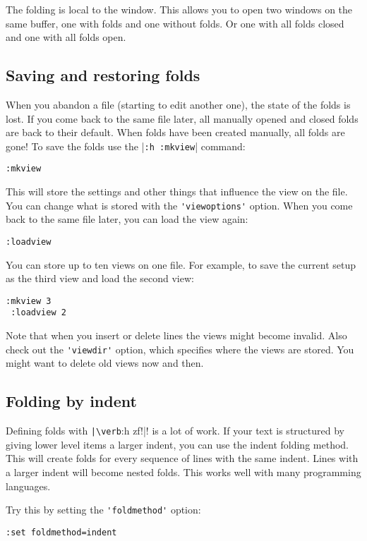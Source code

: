 The folding is local to the window.
This allows you to open two windows on the same buffer, one with folds and one without folds.
Or one with all folds closed and one with all folds open.
\subsection{Saving and restoring folds}
When you abandon a file (starting to edit another one), the state of the folds is lost.
If you come back to the same file later, all manually opened and closed folds are back to their default.
When folds have been created manually, all folds are gone!  To save the folds use the |\verb!:h :mkview!| command:

\begin{Verbatim}[samepage=true]
 :mkview
\end{Verbatim}

This will store the settings and other things that influence the view on the file.
You can change what is stored with the \verb!'viewoptions'! option.
When you come back to the same file later, you can load the view again:

\begin{Verbatim}[samepage=true]
 :loadview
\end{Verbatim}

You can store up to ten views on one file.
For example, to save the current setup as the third view and load the second view:

\begin{Verbatim}[samepage=true]
 :mkview 3
 :loadview 2
\end{Verbatim}

Note that when you insert or delete lines the views might become invalid.
Also check out the \verb!'viewdir'! option, which specifies where the views are stored.
You might want to delete old views now and then.
\subsection{Folding by indent}
Defining folds with \verb!|\verb!:h zf!|! is a lot of work.
If your text is structured by giving lower level items a larger indent, you can use the indent folding method.
This will create folds for every sequence of lines with the same indent.
Lines with a larger indent will become nested folds.
This works well with many programming languages.

Try this by setting the \verb!'foldmethod'! option:

\begin{Verbatim}[samepage=true]
 :set foldmethod=indent
\end{Verbatim}

